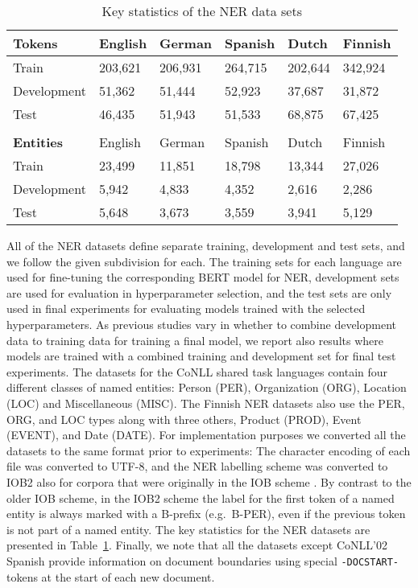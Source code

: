 \documentclass[11pt]{article}
\begin{document}
\begin{table}[!t]
\centering
\begin{tabular}{l|lllll}
\textbf{Tokens}   & English &  German & Spanish & Dutch   & Finnish \\ \hline
Train             & 203,621 & 206,931 & 264,715 & 202,644 & 342,924 \\ Development       &  51,362 &  51,444 &  52,923 &  37,687 &  31,872 \\ Test              &  46,435 &  51,943 &  51,533 &  68,875 &  67,425 \\ \multicolumn{6}{c}{} \\
\textbf{Entities} & English &  German & Spanish & Dutch   & Finnish \\ \hline
Train             &  23,499 &  11,851 &  18,798 &  13,344 &  27,026 \\ Development       &   5,942 &   4,833 &   4,352 &   2,616 &   2,286 \\ Test              &   5,648 &   3,673 &   3,559 &   3,941 &   5,129 \\ \end{tabular}
\caption{Key statistics of the NER data sets}
\label{ner-data}
\end{table}

All of the NER datasets define separate training, development and test sets, and we follow the given subdivision for each. The training sets for each language are used for fine-tuning the corresponding BERT model for NER, development sets are used for evaluation in hyperparameter selection, and the test sets are only used in final experiments for evaluating models trained with the selected hyperparameters. As previous studies vary in whether to combine development data to training data for training a final model, we report also results where models are trained with a combined training and development set for final test experiments.
The datasets for the CoNLL shared task languages contain four different classes of named entities: Person (PER), Organization (ORG), Location (LOC) and Miscellaneous (MISC). The Finnish NER datasets also use the PER, ORG, and LOC types along with three others, Product (PROD), Event (EVENT), and Date (DATE). For implementation purposes we converted all the datasets to the same format prior to experiments: The character encoding of each file was converted to UTF-8, and the NER labelling scheme was converted to IOB2 \cite{ratnaparkhi1998maximum} also for corpora that were originally in the IOB scheme \cite{ramshaw-marcus-1995-text}. By contrast to the older IOB scheme, in the IOB2 scheme the label for the first token of a named entity is always marked with a B-prefix (e.g.\ B-PER), even if the previous token is not part of a named entity.
The key statistics for the NER datasets are presented in Table~\ref{ner-data}. Finally, we note that all the datasets except CoNLL'02 Spanish provide information on document boundaries using special \texttt{-DOCSTART-} tokens at the start of each new document.
\end{document}
